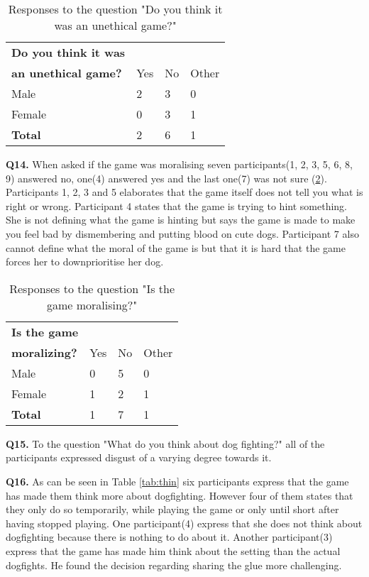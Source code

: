 \begin{table}[h]
\centering
\begin{tabular}{l l l l}
\hline
\textbf{Do you think it was}\\
\textbf{an unethical game?} & Yes & No & Other \\
\hline
Male & 2 & 3 & 0 \\
Female & 0 & 3 & 1 \\
\textbf{Total} & 2 & 6 & 1 \\
\hline
\end{tabular}
\caption{\label{tab:ethi}Responses to the question "Do you think it was an unethical game?"}
\end{table}


\textbf{Q14.} When asked if the game was moralising seven participants(1, 2, 3, 5, 6, 8, 9) answered no, one(4) answered yes and the last one(7) was not sure (\ref{tab:mora}). Participants 1, 2, 3 and 5 elaborates that the game itself does not tell you what is right or wrong. Participant 4 states that the game is trying to hint something. She is not defining what the game is hinting but says the game is made to make you feel bad by dismembering and putting blood on cute dogs. Participant 7 also cannot define what the moral of the game is but that it is hard that the game forces her to downprioritise her dog.

\begin{table}[h]
\centering
\begin{tabular}{l l l l}
\hline
\textbf{Is the game}\\
\textbf{moralizing?} & Yes & No & Other \\
\hline
Male & 0 & 5 & 0 \\
Female & 1 & 2 & 1 \\
\textbf{Total} & 1 & 7 & 1 \\
\hline
\end{tabular}
\caption{\label{tab:mora}Responses to the question "Is the game moralising?"}
\end{table}


\textbf{Q15.} To the question "What do you think about dog fighting?" all of the participants expressed disgust of a varying degree towards it. 


\textbf{Q16.} As can be seen in Table \ref{tab:thin} six participants express that the game has made them think more about dogfighting. However four of them states that they only do so temporarily, while playing the game or only until short after having stopped playing. One participant(4) express that she does not think about dogfighting because there is nothing to do about it. Another participant(3) express that the game has made him think about the setting than the actual dogfights. He found the decision regarding sharing the glue more challenging.


